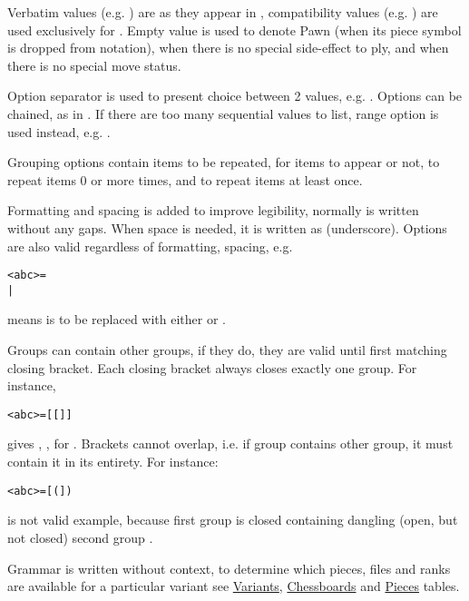 Verbatim values (e.g. ) are as they appear in , compatibility
values (e.g. ) are used exclusively for . Empty value
 is used to denote Pawn (when its piece symbol is dropped from notation),
when there is no special side-effect to ply, and when there is no special move
status.

Option separator \algfmt{|} is used to present choice between 2 values, e.g.
 \algfmt{|} . Options can be chained, as in
 \algfmt{|} \alg{+} \algfmt{|} \alg{\#}. If there are too many
sequential values to list, range option  is used instead, e.g.
  .

Grouping options contain items to be repeated, \algfmt{[ ]} for items to appear
or not, \algfmt{( )} to repeat items 0 or more times, and \algfmt{\{ \}} to repeat
items at least once.

Formatting and spacing is added to improve legibility, normally  is
written without any gaps. When space is needed, it is written as \alg{\_}
(underscore). Options are also valid regardless of formatting, spacing, e.g.
\begin{alltt}
<abc> = 
  | 
\end{alltt}
means  is to be replaced with either  or .

Groups can contain other groups, if they do, they are valid until first matching
closing bracket. Each closing bracket always closes exactly one group. For instance,
\begin{alltt}
<abc> = [[]]
\end{alltt}
gives , ,  for .
Brackets cannot overlap, i.e. if group contains other group, it must contain it in
its entirety. For instance:
\begin{alltt}
<abc> = [(])
\end{alltt}
is not valid example, because first group \algfmt{[ ]} is closed containing
dangling (open, but not closed) second group \algfmt{( )}.

Grammar is written without context, to determine which pieces, files and ranks
are available for a particular variant see
\hyperref[tbl:Appendix/Introduction/Variants]{Variants},
\hyperref[tbl:Appendix/Introduction/Chessboards]{Chessboards} and
\hyperref[tbl:Appendix/Introduction/Pieces]{Pieces} tables.

